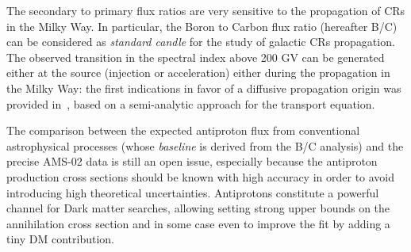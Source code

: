 \documentclass{PoS}
\begin{document}
The  secondary to primary flux ratios are very sensitive to the propagation of CRs in the Milky Way. In particular, the Boron to Carbon flux ratio (hereafter B/C) can be considered as \textit{standard candle} for the study of galactic CRs propagation. The observed transition in the spectral index above 200 GV can be generated  either at the source (injection or acceleration) 
either during the propagation in the Milky Way: the first indications in favor of a diffusive propagation origin was provided in~\cite{Genolini:2017dfb}, based on a semi-analytic approach for the transport equation. 


The comparison between the expected antiproton flux from conventional astrophysical processes (whose \textit{baseline} is derived from the B/C analysis) and the precise AMS-02 data is still an open issue, especially because the antiproton production cross sections should be known with high accuracy in order to avoid introducing high theoretical uncertainties. Antiprotons constitute a powerful channel for Dark matter searches, allowing setting strong upper bounds on the annihilation cross section and in some case even to improve the fit by adding a tiny DM contribution. 

\end{document}
